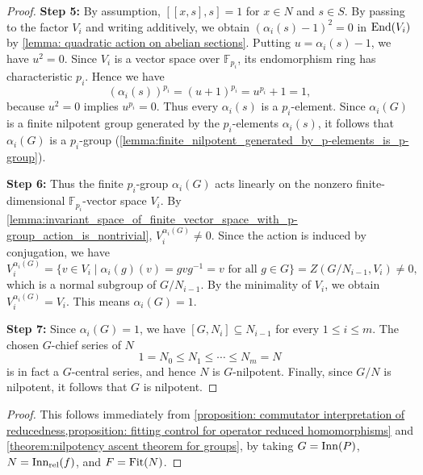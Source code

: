 \begin{proof}
    \textbf{Step 5:}
    By assumption, $[[x,s],s]=1$ for $x\in N$ and $s\in S$. By passing to the factor $V_i$ and writing additively, we obtain $(\alpha_i(s)-1)^2=0$ in 
    $\operatorname{End}(V_i)$
    by \cref{lemma: quadratic action on abelian sections}.
    Putting $u=\alpha_i(s)-1$, we have $u^2=0$. Since $V_i$ is a vector space over $\mathbb{F}_{p_i}$, its endomorphism ring has characteristic $p_i$. Hence we have
    \[ (\alpha_i(s))^{p_i} = (u+1)^{p_i} = u^{p_i} + 1 =1, \]
    because $u^2=0$ implies $u^{p_i}=0$. Thus every $\alpha_i(s)$ is a $p_i$-element. Since $\alpha_i(G)$ is a finite nilpotent group generated by the $p_i$-elements $\alpha_i(s)$, it follows that $\alpha_i(G)$ is a $p_i$-group (\cref{lemma:finite_nilpotent_generated_by_p-elements_is_p-group}).

    \textbf{Step 6:}
    Thus the finite $p_i$-group $\alpha_i(G)$ acts linearly on the nonzero finite-dimensional $\mathbb{F}_{p_i}$-vector space $V_i$. By \cref{lemma:invariant_space_of_finite_vector_space_with_p-group_action_is_nontrivial}, $V_i^{\alpha_i(G)}\neq 0$. Since the action is induced by conjugation, we have
    \[ V_i^{\alpha_i(G)}= \{v \in V_i \mid \alpha_i(g)(v)=gvg^{-1}=v \text{ for all } g\in G \} = Z(G/N_{i-1},V_i)\neq 0, \]
    which is a normal subgroup of $G/N_{i-1}$. By the minimality of $V_i$, we obtain $V_i^{\alpha_i(G)}=V_i$. This means $\alpha_i(G)=1$. 

    \textbf{Step 7:}
    Since $\alpha_i(G)=1$, we have $[G,N_i] \subseteq N_{i-1}$ for every $1\leq i \leq m$. The chosen $G$-chief series of $N$
    \[ 1=N_0 \leq N_1 \leq \cdots \leq N_m=N \]
    is in fact a $G$-central series, and hence $N$ is $G$-nilpotent. Finally, since $G/N$ is nilpotent, it follows that $G$ is nilpotent.
\end{proof}


\begin{proof}
This follows immediately from \cref{proposition: commutator interpretation of reducedness,proposition: fitting control for operator reduced homomorphisms} and \cref{theorem:nilpotency ascent theorem for groups}, by taking $G=\operatorname{Inn}(P)$, $N=\operatorname{Inn_{rel}}(f)$, and $F=\operatorname{Fit}(N)$.
\end{proof}



